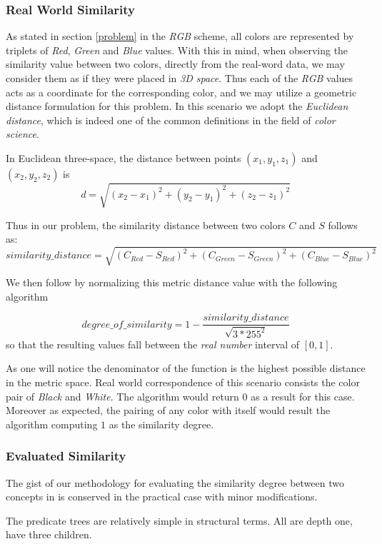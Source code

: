 \documentclass[egilmezThesis.tex]{subfiles}
\begin{document}
\subsubsection{Real World Similarity}
\label{rws}
As stated in section \ref{problem} in the \textit{RGB} scheme, all colors are represented by triplets of  \textit{Red}, \textit{Green} and \textit{Blue} values. With this in mind, when observing the similarity value between two colors, directly from the real-word data, we may consider them as if they were placed in \textit{3D space}. Thus each of the \textit{RGB} values acts as a coordinate for the corresponding color, and we may utilize a geometric distance formulation for this problem. In this scenario we adopt the \textit{Euclidean distance}, which is indeed one of the common definitions in the field of \textit{color science}. \cite{Sha02}

In Euclidean three-space, the distance between points $(x_1, y_1, z_1)$ and $(x_2, y_2, z_2)$ is
$$d=\sqrt{(x_2-x_1)^2+(y_2-y_1)^2+(z_2-z_1)^2}$$

Thus in our problem, the similarity distance between two colors $C$ and $S$ follows as:
$$similarity\_distance=\sqrt{(C_{Red}-S_{Red})^2+(C_{Green}-S_{Green})^2+(C_{Blue}-S_{Blue})^2}$$

We then follow by normalizing this metric distance value with the following algorithm

$$degree\_of\_similarity = 1 - \frac{similarity\_distance}{\sqrt{3*255^2}}$$
so that the resulting values fall between the \textit{real number} interval of $[0,1]$.

As one will notice the denominator of the function is the highest possible distance in the metric space. Real world correspondence of this scenario consists the color pair of \textit{Black} and \textit{White}. The algorithm would return $0$ as a result for this case. Moreover as expected, the pairing of any color with itself would result the algorithm computing $1$ as the similarity degree.

\subsubsection{Evaluated Similarity}
\label{evalSimPrac}

The gist of our methodology for evaluating the similarity degree between two concepts in \cite{Sin12}  is conserved in the practical case with minor modifications.

The predicate trees are relatively simple in structural terms. All are depth one, have three children.
\end{document}

